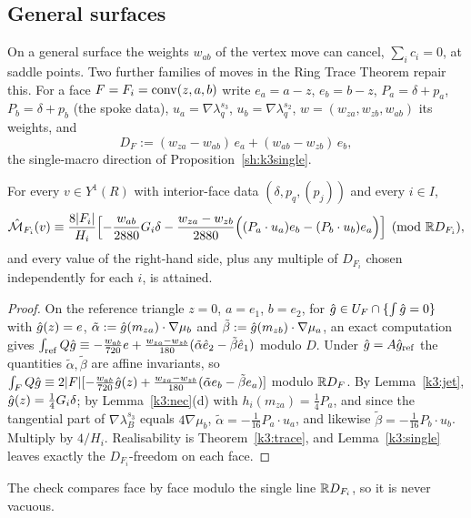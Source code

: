 \subsection{General surfaces}
On a general surface the weights $w_{ab}$ of the vertex move can cancel, $\sum_ic_i=0$, at saddle points. Two further families of moves in the Ring Trace Theorem repair this. For a face $F=F_i=\operatorname{conv}(z,a,b)$ write $e_a=a-z$, $e_b=b-z$, $P_a=\delta+p_a$, $P_b=\delta+p_b$ (the spoke data), $u_a=\nabla\lambda_q^{s_3}$, $u_b=\nabla\lambda_q^{s_2}$, $w=(w_{za},w_{zb},w_{ab})$ its weights, and
\[
D_F:=(w_{za}-w_{ab})\,e_a+(w_{ab}-w_{zb})\,e_b,
\]
the single-macro direction of Proposition~\ref{sh:k3single}.

\begin{lemma}\label{k3:face}
For every $v\in Y^1(R)$ with interior-face data $(\delta,p_q,(p_j))$ and every $i\in I$,
\[
\hat{\mathcal M}_{F_i}(v)\equiv\frac{8|F_i|}{H_i}\Bigl[-\frac{w_{ab}}{2880}G_i\delta-\frac{w_{za}-w_{zb}}{2880}\Bigl((P_a\cdot u_a)e_b-(P_b\cdot u_b)e_a\Bigr)\Bigr]\pmod{\mathbb R D_{F_i}},
\]
and every value of the right-hand side, plus any multiple of $D_{F_i}$ chosen independently for each $i$, is attained. 
\end{lemma}

\begin{proof}
On the reference triangle $z=0$, $a=e_1$, $b=e_2$, for $\hat g\in U_F\cap\{\int\hat g=0\}$ with $\hat g(z)=e$, $\tilde\alpha:=\hat g(m_{za})\cdot\nabla\mu_b$ and $\tilde\beta:=\hat g(m_{zb})\cdot\nabla\mu_a$, an exact computation gives $\int_{\rm ref}Q\hat g\equiv-\frac{w_{ab}}{720}e+\frac{w_{za}-w_{zb}}{180}(\tilde\alpha\hat e_2-\tilde\beta\hat e_1)$ modulo $D$. Under $\hat g=A\hat g_{\rm ref}$ the quantities $\tilde\alpha,\tilde\beta$ are affine invariants, so $\int_FQ\hat g\equiv2|F|[-\frac{w_{ab}}{720}\hat g(z)+\frac{w_{za}-w_{zb}}{180}(\tilde\alpha e_b-\tilde\beta e_a)]$ modulo $\mathbb R D_F$. By Lemma~\ref{k3:jet}, $\hat g(z)=\frac14G_i\delta$; by Lemma~\ref{k3:nec}(d) with $h_i(m_{za})=\frac14P_a$, and since the tangential part of $\nabla\lambda_B^{s_3}$ equals $4\nabla\mu_b$, $\tilde\alpha=-\frac1{16}P_a\cdot u_a$, and likewise $\tilde\beta=-\frac1{16}P_b\cdot u_b$. Multiply by $4/H_i$. Realisability is Theorem~\ref{k3:trace}, and Lemma~\ref{k3:single} leaves exactly the $D_{F_i}$-freedom on each face.
\end{proof}
The check compares face by face modulo the single line $\mathbb R D_{F_i}$, so it is never vacuous.

